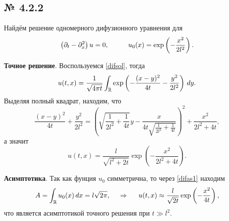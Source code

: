 


\subsection*{№ 4.2.2}

Найдём решение одномерного дифузионного уравнения для 
\begin{equation*}
    \left(\partial_t - \partial_x^2\right) u = 0,
    \hspace{10 mm} 
    u_0(x) = \exp\left(- \frac{x^2}{2l^2}\right).
\end{equation*}

\textbf{Точное решение}. Воспользуемся \eqref{difsol}, тогда
\begin{equation*}
    u(t, x) = \frac{1}{\sqrt{4 \pi t}}\int_{\mathbb{R}} \exp\left(
        - \frac{(x-y)^2}{4 t} - \frac{y^2}{2 l^2}
    \right) \, d y.
\end{equation*}
Выделяя полный квадрат, находим, что
\begin{equation*}
    \frac{(x-y)^2}{4 t} + \frac{y^2}{2 l^2} = \left(\sqrt{\frac{1}{2 l^2} + \frac{1}{4 t}} y -\frac{x}{4 t \sqrt{\frac{1}{2 l^2}+\frac{1}{4 t}}}\right)^2+\frac{x^2}{2 l^2+4 t},
\end{equation*}
а значит
\begin{equation*}
    u(t, x) = \frac{l}{\sqrt{l^2 + 2 t}} \exp\left(
        - \frac{x^2}{2 l^2 + 4 t}
    \right).
\end{equation*}


\textbf{Асимптотика}. Так как фунция $u_0$ симметрична, то через \eqref{difas1} находим
\begin{equation*}
    A = \int_{\mathbb{R}} u_0 (x) \, d x = l \sqrt{2 \pi},
    \hspace{0.5cm} \Rightarrow \hspace{0.5cm}
    u(t, x) \approx \frac{l}{\sqrt{2 t}} \exp\left(- \frac{x^2}{4 t}\right),
\end{equation*}
что является асимптотикой точного решения при $t \gg l^2$.




